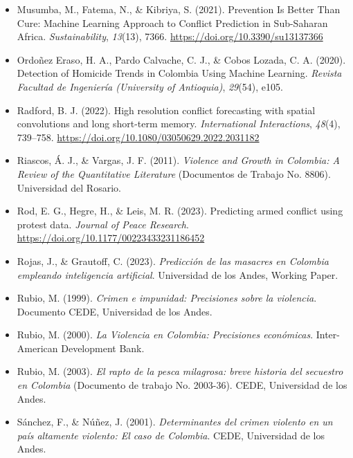 \documentclass[12pt]{article}
\begin{document}
\begin{itemize}
    \item Musumba, M., Fatema, N., \& Kibriya, S. (2021). Prevention Is Better Than Cure: Machine Learning Approach to Conflict Prediction in Sub-Saharan Africa. \textit{Sustainability}, \textit{13}(13), 7366. \url{https://doi.org/10.3390/su13137366}
    
    \item Ordoñez Eraso, H. A., Pardo Calvache, C. J., \& Cobos Lozada, C. A. (2020). Detection of Homicide Trends in Colombia Using Machine Learning. \textit{Revista Facultad de Ingeniería (University of Antioquia)}, \textit{29}(54), e105.
    
    \item Radford, B. J. (2022). High resolution conflict forecasting with spatial convolutions and long short-term memory. \textit{International Interactions}, \textit{48}(4), 739--758. \url{https://doi.org/10.1080/03050629.2022.2031182}
    
    \item Riascos, Á. J., \& Vargas, J. F. (2011). \textit{Violence and Growth in Colombia: A Review of the Quantitative Literature} (Documentos de Trabajo No. 8806). Universidad del Rosario.
    
    \item Rod, E. G., Hegre, H., \& Leis, M. R. (2023). Predicting armed conflict using protest data. \textit{Journal of Peace Research}. \url{https://doi.org/10.1177/00223433231186452}
    
    \item Rojas, J., \& Grautoff, C. (2023). \textit{Predicción de las masacres en Colombia empleando inteligencia artificial}. Universidad de los Andes, Working Paper.
    
    \item Rubio, M. (1999). \textit{Crimen e impunidad: Precisiones sobre la violencia}. Documento CEDE, Universidad de los Andes.
    
    \item Rubio, M. (2000). \textit{La Violencia en Colombia: Precisiones económicas}. Inter-American Development Bank.
    
    \item Rubio, M. (2003). \textit{El rapto de la pesca milagrosa: breve historia del secuestro en Colombia} (Documento de trabajo No. 2003-36). CEDE, Universidad de los Andes.
    
    \item Sánchez, F., \& Núñez, J. (2001). \textit{Determinantes del crimen violento en un país altamente violento: El caso de Colombia}. CEDE, Universidad de los Andes.
    

\end{itemize}
\end{document}
